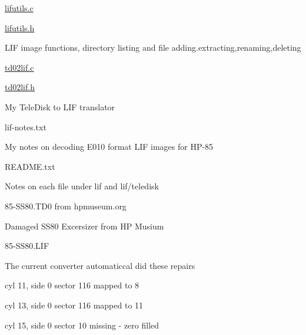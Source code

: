 \begin{DoxyItemize}
\begin{DoxyItemize}
\begin{DoxyItemize}
\begin{DoxyItemize}
\begin{DoxyItemize}
\end{DoxyItemize}
\end{DoxyItemize}
\item \hyperlink{lifutils_8c}{lifutils.\+c}
\item \hyperlink{lifutils_8h}{lifutils.\+h}
\begin{DoxyItemize}
\item L\+IF image functions, directory listing and file adding.\+extracting,renaming,deleting
\end{DoxyItemize}
\item \hyperlink{td02lif_8c}{td02lif.\+c}
\item \hyperlink{td02lif_8h}{td02lif.\+h}
\begin{DoxyItemize}
\item My Tele\+Disk to L\+IF translator
\end{DoxyItemize}
\item lif-\/notes.\+txt
\begin{DoxyItemize}
\item My notes on decoding E010 format L\+IF images for H\+P-\/85
\end{DoxyItemize}
\item R\+E\+A\+D\+M\+E.\+txt
\begin{DoxyItemize}
\item Notes on each file under lif and lif/teledisk
\end{DoxyItemize}
\item 85-\/\+S\+S80.\+T\+D0 from hpmuseum.\+org
\begin{DoxyItemize}
\item Damaged S\+S80 Excersizer from HP Musium
\end{DoxyItemize}
\item 85-\/\+S\+S80.\+L\+IF
\begin{DoxyItemize}
\item The current converter automaticcal did these repairs
\begin{DoxyItemize}
\item cyl 11, side 0 sector 116 mapped to 8
\item cyl 13, side 0 sector 116 mapped to 11
\item cyl 15, side 0 sector 10 missing -\/ zero filled
\end{DoxyItemize}
\end{DoxyItemize}
\end{DoxyItemize}
\end{DoxyItemize}
\end{DoxyItemize}

